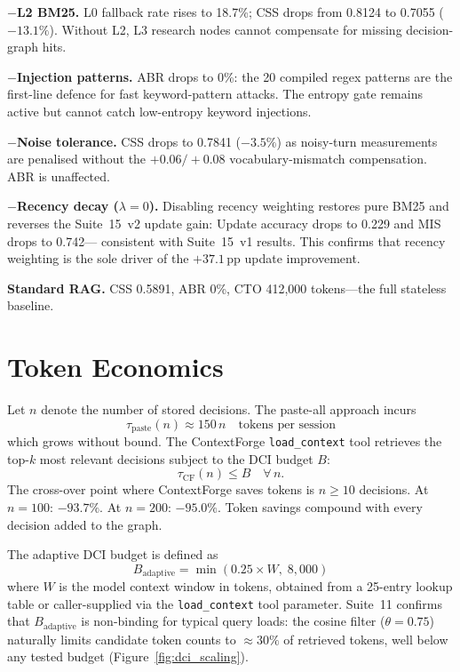 \documentclass[11pt,twocolumn]{article}
\begin{document}
\textbf{$-$L2 BM25.}
L0 fallback rate rises to 18.7\%; CSS drops from 0.8124 to 0.7055 ($-13.1\%$).
Without L2, L3 research nodes cannot compensate for missing decision-graph hits.

\textbf{$-$Injection patterns.}
ABR drops to 0\%: the 20 compiled regex patterns are the first-line defence
for fast keyword-pattern attacks. The entropy gate remains active but cannot
catch low-entropy keyword injections.

\textbf{$-$Noise tolerance.}
CSS drops to 0.7841 ($-3.5\%$) as noisy-turn measurements are penalised without
the $+0.06/+0.08$ vocabulary-mismatch compensation. ABR is unaffected.

\textbf{$-$Recency decay ($\lambda=0$).}
Disabling recency weighting restores pure BM25 and reverses the Suite~15~v2
update gain: Update accuracy drops to 0.229 and MIS drops to 0.742---
consistent with Suite~15~v1 results. This confirms that recency weighting is
the sole driver of the $+37.1$\,pp update improvement.

\textbf{Standard RAG.}
CSS 0.5891, ABR 0\%, CTO 412{,}000 tokens---the full stateless baseline.

\section{Token Economics}
\label{sec:tokeneconomics}

Let $n$ denote the number of stored decisions. The paste-all approach incurs
\begin{equation}
  \tau_{\text{paste}}(n) \approx 150\,n \quad \text{tokens per session}
  \label{eq:paste}
\end{equation}
which grows without bound. The ContextForge \texttt{load\_context} tool
retrieves the top-$k$ most relevant decisions subject to the DCI budget $B$:
\begin{equation}
  \tau_{\text{CF}}(n) \leq B \quad \forall\, n.
  \label{eq:cf_bound}
\end{equation}
The cross-over point where ContextForge saves tokens is $n \geq 10$ decisions.
At $n = 100$: $-93.7\%$. At $n = 200$: $-95.0\%$.
Token savings compound with every decision added to the graph.

The adaptive DCI budget is defined as
\begin{equation}
  B_{\mathrm{adaptive}} = \min(0.25 \times W,\; 8{,}000)
  \label{eq:adaptive_budget}
\end{equation}
where $W$ is the model context window in tokens, obtained from a 25-entry
lookup table or caller-supplied via the \texttt{load\_context} tool parameter.
Suite~11 confirms that $B_{\mathrm{adaptive}}$ is non-binding for typical
query loads: the cosine filter ($\theta=0.75$) naturally limits candidate
token counts to ${\approx}30\%$ of retrieved tokens, well below any tested
budget (Figure~\ref{fig:dci_scaling}).
\end{document}
